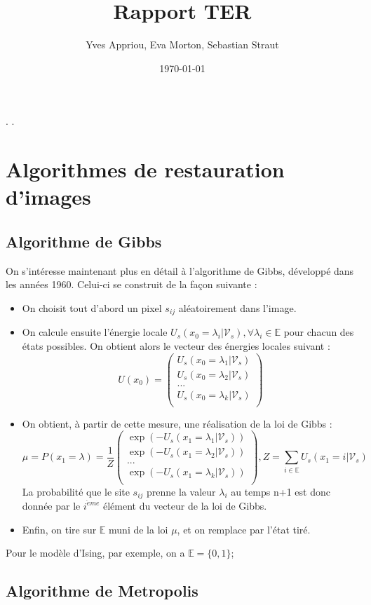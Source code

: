 \documentclass[a4paper, 12pt]{article}
\title{Rapport TER}
\author{Yves Appriou, Eva Morton, Sebastian Straut}
\date{\today}
\begin{document}
\maketitle

\tableofcontents.
\newpage.
\section{Algorithmes de restauration d'images}
\subsection[Algorithme de Gibbs]{Algorithme de Gibbs}
On s'intéresse maintenant plus en détail à l'algorithme de Gibbs, développé dans les années 1960. Celui-ci se construit de la façon suivante : 
\begin{itemize}
\item On choisit tout d'abord un pixel $s_{ij} $ aléatoirement dans l'image.
\item On calcule ensuite l'énergie locale $U_s(x_0=\lambda_i| \mathcal{V}_s), \forall \lambda_i \in \mathbb{E}  $ pour chacun des états possibles. On obtient alors le vecteur des énergies locales suivant : 
\[
  U(x_0) = \left(
          \begin{array}{ll}
            U_s(x_0=\lambda_1| \mathcal{V}_s) \\
            U_s(x_0=\lambda_2| \mathcal{V}_s) \\
            ...\\
            U_s(x_0=\lambda_k| \mathcal{V}_s) \\
          \end{array}
        \right)
\]
\item On obtient, à partir de cette mesure, une réalisation de la loi de Gibbs : 
\[
  \mu = P(x_1 = \lambda) = \frac{1}{Z} \left(
          \begin{array}{ll}
            \exp(-U_s(x_1=\lambda_1| \mathcal{V}_s)) \\
            \exp(-U_s(x_1=\lambda_2| \mathcal{V}_s)) \\
            ...\\
            \exp(-U_s(x_1=\lambda_k| \mathcal{V}_s)) \\
          \end{array}
        \right)
        , Z= \sum_{i\in \mathbb{E}} {U_s(x_1=i | \mathcal{V}_s)}
\]
La probabilité que le site $s_{ij}$ prenne la valeur $\lambda_i$ au temps n+1 est donc donnée par le $i^{\grave{e}me}$ élément du vecteur de la loi de Gibbs.
\item Enfin, on tire sur $\mathbb{E}$ muni de la loi $\mu$, et on remplace par l'état tiré.
\end{itemize}
Pour le modèle d'Ising, par exemple, on a $\mathbb{E} =\{0,1\}$;

\subsection[Algorithme de Metropolis]{Algorithme de Metropolis}
\end{document}
